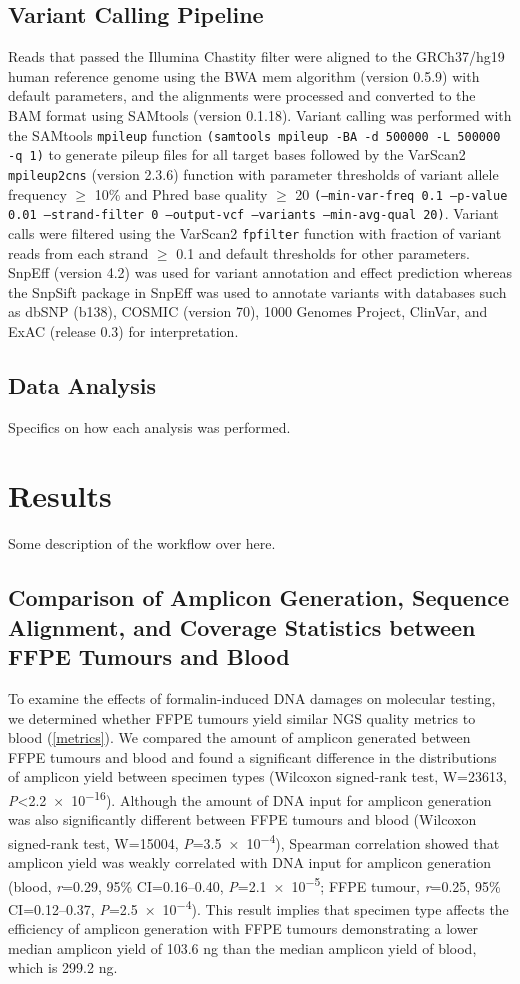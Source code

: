 \documentclass{bmcart}
\begin{document}
\subsection*{Variant Calling Pipeline}
Reads that passed the Illumina Chastity filter were aligned to the GRCh37/hg19 human reference genome using the BWA mem algorithm (version 0.5.9) with default parameters, and the alignments were processed and converted to the BAM format using SAMtools (version 0.1.18). Variant calling was performed with the SAMtools \texttt{mpileup} function \texttt{(samtools mpileup -BA -d 500000 -L 500000 -q 1)} to generate pileup files for all target bases followed by the VarScan2 \texttt{mpileup2cns} (version 2.3.6) function with parameter thresholds of variant allele frequency $\geq$ 10\% and Phred base quality $\geq$ 20 \texttt{(--min-var-freq 0.1 --p-value 0.01 --strand-filter 0 --output-vcf --variants --min-avg-qual 20)}. Variant calls were filtered using the VarScan2 \texttt{fpfilter} function with fraction of variant reads from each strand $\geq$ 0.1 and default thresholds for other parameters. SnpEff (version 4.2) was used for variant annotation and effect prediction whereas the SnpSift package in SnpEff was used to annotate variants with databases such as dbSNP (b138), COSMIC (version 70), 1000 Genomes Project, ClinVar, and ExAC (release 0.3) for interpretation.

\subsection*{Data Analysis}
Specifics on how each analysis was performed.


\section*{Results}
Some description of the workflow over here.

\subsection*{Comparison of Amplicon Generation, Sequence Alignment, and Coverage Statistics between FFPE Tumours and Blood}
To examine the effects of formalin-induced DNA damages on molecular testing, we determined whether FFPE tumours yield similar NGS quality metrics to blood (\autoref{metrics}). We compared the amount of amplicon generated between FFPE tumours and blood and found a significant difference in the distributions of amplicon yield between specimen types (Wilcoxon signed-rank test, W=\num{23613}, \textit{P}\textless \num{2.2e-16}). Although the amount of DNA input for amplicon generation was also significantly different between FFPE tumours and blood (Wilcoxon signed-rank test, W=15004, \textit{P}=\num{3.5e-4}), Spearman correlation showed that amplicon yield was weakly correlated with DNA input for amplicon generation (blood, \textit{r}=0.29, 95\% CI=0.16--0.40, \textit{P}=\num{2.1e-5}; FFPE tumour, \textit{r}=0.25, 95\% CI=0.12--0.37, \textit{P}=\num{2.5e-4}). This result implies that specimen type affects the efficiency of amplicon generation with FFPE tumours demonstrating a lower median amplicon yield of 103.6 ng than the median amplicon yield of blood, which is 299.2 ng.
\end{document}
